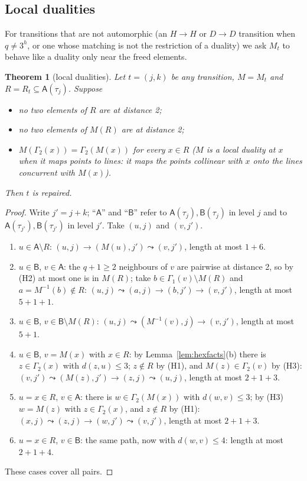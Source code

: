 \documentclass[11pt]{amsart}
\newtheorem{theorem}{Theorem}[section]
\theoremstyle{definition}
\theoremstyle{remark}
\numberwithin{equation}{section}
\begin{document}
\subsection{Local dualities}
For transitions that are not automorphic (an $H\to H$ or $D\to D$ transition when $q\ne3^h$, or one whose matching is not
the restriction of a duality) we ask $M_t$ to behave like a duality only near the freed elements.

\begin{theorem}[local dualities]\label{thm:localdual}
Let $t=(j,k)$ be any transition, $M=M_t$ and $R=R_t\subseteq\mathsf A(\tau_j)$. Suppose
\begin{itemize}
\item[(H1)] no two elements of $R$ are at distance 2;
\item[(H2)] no two elements of $M(R)$ are at distance 2;
\item[(H3)] $M(\Gamma_2(x))=\Gamma_2(M(x))$ for every $x\in R$ ($M$ is a \emph{local duality} at $x$ when it maps points to
  lines: it maps the points collinear with $x$ onto the lines concurrent with $M(x)$).
\end{itemize}
Then $t$ is repaired.
\end{theorem}

\begin{proof}
Write $j'=j+k$; ``$\mathsf A$'' and ``$\mathsf B$'' refer to $\mathsf A(\tau_j),\mathsf B(\tau_j)$ in level $j$ and to
$\mathsf A(\tau_{j'}),\mathsf B(\tau_{j'})$ in level $j'$. Take $(u,j)$ and $(v,j')$.
\begin{enumerate}
\item $u\in\mathsf A\setminus R$: $(u,j)\to(M(u),j')\leadsto(v,j')$, length at most $1+6$.
\item $u\in\mathsf B$, $v\in\mathsf A$: the $q+1\ge2$ neighbours of $v$ are pairwise at distance 2, so by (H2) at most one is
  in $M(R)$; take $b\in\Gamma_1(v)\setminus M(R)$ and $a=M^{-1}(b)\notin R$: $(u,j)\leadsto(a,j)\to(b,j')\to(v,j')$, length
  at most $5+1+1$.
\item $u\in\mathsf B$, $v\in\mathsf B\setminus M(R)$: $(u,j)\leadsto(M^{-1}(v),j)\to(v,j')$, length at most $5+1$.
\item $u\in\mathsf B$, $v=M(x)$ with $x\in R$: by Lemma~\ref{lem:hexfacts}(b) there is $z\in\Gamma_2(x)$ with $d(z,u)\le3$;
  $z\notin R$ by (H1), and $M(z)\in\Gamma_2(v)$ by (H3): $(v,j')\leadsto(M(z),j')\to(z,j)\leadsto(u,j)$, length at most
  $2+1+3$.
\item $u=x\in R$, $v\in\mathsf A$: there is $w\in\Gamma_2(M(x))$ with $d(w,v)\le3$; by (H3) $w=M(z)$ with $z\in\Gamma_2(x)$,
  and $z\notin R$ by (H1): $(x,j)\leadsto(z,j)\to(w,j')\leadsto(v,j')$, length at most $2+1+3$.
\item $u=x\in R$, $v\in\mathsf B$: the same path, now with $d(w,v)\le4$: length at most $2+1+4$.
\end{enumerate}
These cases cover all pairs.
\end{proof}
\end{document}
